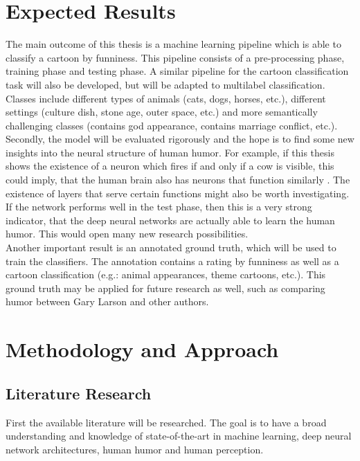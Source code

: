 \documentclass[draft,final,oneside]{vutinfth} %
\begin{document}
\chapter{Expected Results}

The main outcome of this thesis is a machine learning pipeline which is able to classify a cartoon by funniness. This pipeline consists of a pre-processing phase, training phase and testing phase. A similar pipeline for the cartoon classification task will also be developed, but will be adapted to multilabel classification. Classes include different types of animals (cats, dogs, horses, etc.), different settings (culture dish, stone age, outer space, etc.) and more semantically challenging classes (contains god appearance, contains marriage conflict, etc.). \\

Secondly, the model will be evaluated rigorously and the hope is to find some new insights into the neural structure of human humor. For example, if this thesis shows the existence of a neuron which fires if and only if a cow is visible, this could imply, that the human brain also has neurons that function similarly \cite{Cichy2016}. The existence of layers that serve certain functions might also be worth investigating. \\

If the network performs well in the test phase, then this is a very strong indicator, that the deep neural networks are actually able to learn the human humor. This would open many new research possibilities. \\

Another important result is an annotated ground truth, which will be used to train the classifiers. The annotation contains a rating by funniness as well as a cartoon classification (e.g.: animal appearances, theme cartoons, etc.). This ground truth may be applied for future research as well, such as comparing humor between Gary Larson and other authors.

\chapter{Methodology and Approach}
\section {Literature Research}
First the available literature will be researched. The goal is to have a broad understanding and knowledge of state-of-the-art in machine learning, deep neural network architectures, human humor and human perception. \\
\end{document}
